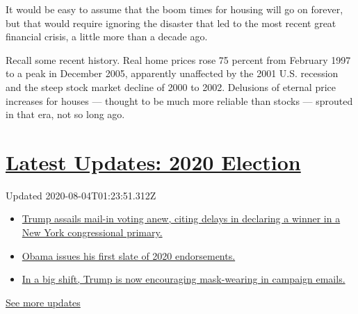 It would be easy to assume that the boom times for housing will go on
forever, but that would require ignoring the disaster that led to the
most recent great financial crisis, a little more than a decade ago.

Recall some recent history. Real home prices rose 75 percent from
February 1997 to a peak in December 2005, apparently unaffected by the
2001 U.S. recession and the steep stock market decline of 2000 to 2002.
Delusions of eternal price increases for houses --- thought to be much
more reliable than stocks --- sprouted in that era, not so long ago.

\hypertarget{latest-updates-2020-election}{%
\section{\texorpdfstring{\href{https://www.nytimes3xbfgragh.onion/2020/08/03/us/elections/biden-vs-trump.html?action=click\&pgtype=Article\&state=default\&region=MAIN_CONTENT_1\&context=storylines_live_updates}{Latest
Updates: 2020
Election}}{Latest Updates: 2020 Election}}\label{latest-updates-2020-election}}

Updated 2020-08-04T01:23:51.312Z

\begin{itemize}
\tightlist
\item
  \href{https://www.nytimes3xbfgragh.onion/2020/08/03/us/elections/biden-vs-trump.html?action=click\&pgtype=Article\&state=default\&region=MAIN_CONTENT_1\&context=storylines_live_updates\#link-6494b448}{Trump
  assails mail-in voting anew, citing delays in declaring a winner in a
  New York congressional primary.}
\item
  \href{https://www.nytimes3xbfgragh.onion/2020/08/03/us/elections/biden-vs-trump.html?action=click\&pgtype=Article\&state=default\&region=MAIN_CONTENT_1\&context=storylines_live_updates\#link-3de249e6}{Obama
  issues his first slate of 2020 endorsements.}
\item
  \href{https://www.nytimes3xbfgragh.onion/2020/08/03/us/elections/biden-vs-trump.html?action=click\&pgtype=Article\&state=default\&region=MAIN_CONTENT_1\&context=storylines_live_updates\#link-54e34d20}{In
  a big shift, Trump is now encouraging mask-wearing in campaign
  emails.}
\end{itemize}

\href{https://www.nytimes3xbfgragh.onion/2020/08/03/us/elections/biden-vs-trump.html?action=click\&pgtype=Article\&state=default\&region=MAIN_CONTENT_1\&context=storylines_live_updates}{See
more updates}


